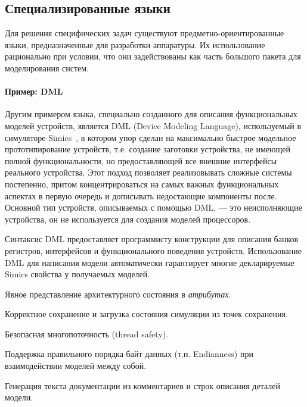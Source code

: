 






\subsection{Специализированные языки}

Для решения специфических задач существуют предметно-ориентированные языки, предназначенные для разработки аппаратуры. Их использование рационально при условии, что они задействованы как часть большого пакета для моделирования систем.

\paragraph{Пример: DML}

Другим примером языка, специально созданного для описания функциональных моделей устройств, является DML (Device Modeling Language), используемый в симуляторе Simics~\cite{dml-tutorial}, в котором упор сделан на максимально быстрое модельное прототипирование устройств, т.е. создание заготовки устройства, не имеющей полной функциональности, но предоставляющей все внешние интерфейсы реального устройства. Этот подход позволяет реализовывать сложные системы постепенно, притом концентрироваться на самых  важных функциональных аспектах в первую очередь и дописывать недостающие компоненты после. Основной тип устройств, описываемых с помощью DML, --- это неисполняющие устройства, он не используется для создания моделей процессоров.

Синтаксис DML предоставляет программисту конструкции для описания банков регистров, интерфейсов и функционального поведения устройств. Использование DML для написания модели автоматически гарантирует многие декларируемые Simics свойства у получаемых моделей.

\begin{itemize*}
\item Явное представление архитектурного состояния в \textit{атрибутах}.
\item Корректное сохранение и загрузка состояния симуляции из точек сохранения.
\item Безопасная многопоточность (\abbr thread safety).
\item Поддержка правильного порядка байт данных (т.н. Endianness) при взаимодействии моделей между собой.
\item Генерация текста документации из комментариев и строк описания деталей модели.
\end{itemize*}

